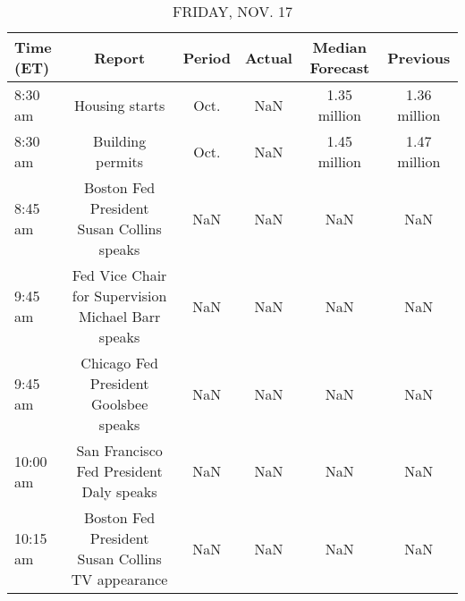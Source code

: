 \documentclass{article}%
\begin{document}
%


\begin{table}[htbp]%
\caption{FRIDAY, NOV. 17}%
\centering%
\begin{adjustbox}{width=1\textwidth}%
\begin{tabular}{lccccc}
\toprule
Time (ET) &                                             Report & Period & Actual & Median Forecast &     Previous \\
\midrule
  8:30 am &                                     Housing starts &   Oct. &    NaN &    1.35 million & 1.36 million \\
  8:30 am &                                   Building permits &   Oct. &    NaN &    1.45 million & 1.47 million \\
  8:45 am &          Boston Fed President Susan Collins speaks &    NaN &    NaN &             NaN &          NaN \\
  9:45 am & Fed Vice Chair for Supervision Michael Barr speaks &    NaN &    NaN &             NaN &          NaN \\
  9:45 am &              Chicago Fed President Goolsbee speaks &    NaN &    NaN &             NaN &          NaN \\
 10:00 am &            San Francisco Fed President Daly speaks &    NaN &    NaN &             NaN &          NaN \\
 10:15 am &   Boston Fed President Susan Collins TV appearance &    NaN &    NaN &             NaN &          NaN \\
\bottomrule
\end{tabular}
%
\end{adjustbox}%
\end{table}
\end{document}
